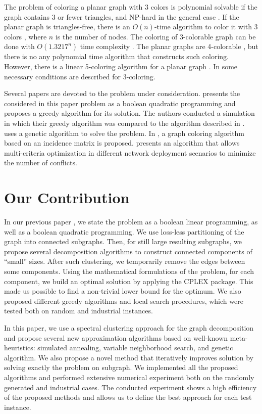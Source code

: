 \documentclass[runningheads]{llncs}
\begin{document}
The problem of coloring a planar graph with 3 colors is polynomial solvable if the graph contains 3 or fewer triangles, and NP-hard in the general case \cite{Cavallaro:21,Dailey:80}. If the planar graph is triangles-free, there is an $O(n)$-time algorithm to color it with 3 colors \cite{Dvorak:9}, where $n$ is the number of nodes. The coloring of 3-colorable graph can be done with $O(1.3217^{n})$ time complexity \cite{Meijer:23}. The planar graphs are 4-colorable \cite{Gonthier:8}, but there is no any polynomial time algorithm that constructs such coloring. However, there is a linear 5-coloring algorithm for a planar graph \cite{Chiba:81}. In \cite{DeIta:12} some necessary conditions are described for 3-coloring.

Several papers are devoted to the problem under consideration. \cite{Gui:18} presents the considered in this paper problem as a boolean quadratic programming and proposes a greedy algorithm for its solution. The authors conducted a simulation in which their greedy algorithm was compared to the algorithm described in \cite{Bandh:09}. \cite{Chandra:21} uses a genetic algorithm to solve the problem. In \cite{Abdullah:14}, a graph coloring algorithm based on an incidence matrix is proposed. \cite{Chrost:13} presents an algorithm that allows multi-criteria optimization in different network deployment scenarios to minimize the number of conflicts.

\section{Our Contribution}
In our previous paper \cite{Erzin:24}, we state the problem as a boolean linear programming, as well as a boolean quadratic programming. We use loss-less partitioning of the graph into connected subgraphs. Then, for still large resulting subgraphs, we propose several decomposition algorithms to construct connected components of ``small'' sizes. After such clustering, we temporarily remove the edges between some components. Using the mathematical formulations of the problem, for each component, we build an optimal solution by applying the CPLEX package. This made us possible to find a non-trivial lower bound for the optimum. We also proposed different greedy algorithms and local search procedures, which were tested both on random and industrial instances.

In this paper, we use a spectral clustering approach for the graph decomposition and propose several new approximation algorithms based on well-known meta-heuristics: simulated annealing, variable neighborhood search, and genetic algorithm. We also propose a novel method that iteratively improves solution by solving exactly the problem on subgraph. We implemented all the proposed algorithms and performed extensive numerical experiment both on the randomly generated and industrial cases. The conducted experiment shows a high efficiency of the proposed methods and allows us to define the best approach for each test instance.
\end{document}
